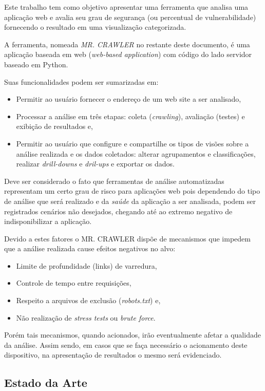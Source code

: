 \documentclass[twocolumn,showpacs,%
  nofootinbib,aps,superscriptaddress,%
  eqsecnum,prd,notitlepage,showkeys,10pt]{revtex4-1}
\begin{document}
Este trabalho tem como objetivo apresentar uma ferramenta que analisa uma aplicação web e avalia seu grau de segurança (ou percentual de vulnerabilidade) fornecendo o resultado em uma visualização categorizada.

A ferramenta, nomeada \emph{MR. CRAWLER} no restante deste documento, é uma aplicação baseada em web (\emph{web-based application}) com código do lado servidor baseado em Python.

Suas funcionalidades podem ser sumarizadas em:

\begin{itemize}
\item Permitir ao usuário fornecer o endereço de um web site a ser analisado,
\item Processar a análise em três etapas: coleta (\emph{crawling}), avaliação (testes) e exibição de resultados e,
\item Permitir ao usuário que configure e compartilhe os tipos de visões sobre a análise realizada e os dados coletados: alterar agrupamentos e classificações, realizar \emph{drill-downs} e \emph{dril-ups} e exportar os dados.
\end{itemize}

Deve ser considerado o fato que ferramentas de análise automatizadas representam um certo grau de risco para aplicações web pois dependendo do tipo de análise que será realizado e da \emph{saúde} da aplicação a ser analisada, podem ser registrados cenários não desejados, chegando até ao extremo negativo de indisponibilizar a aplicação.

Devido a estes fatores o MR. CRAWLER dispõe de mecanismos que impedem que a análise realizada cause efeitos negativos no alvo:

\begin{itemize}
\item Limite de profundidade (links) de varredura,
\item Controle de tempo entre requisições,
\item Respeito a arquivos de exclusão (\emph{robots.txt}) e,
\item Não realização de \emph{stress tests} ou \emph{brute force}.
\end{itemize}

Porém tais mecanismos, quando acionados, irão eventualmente afetar a qualidade da análise. Assim sendo, em casos que se faça necessário o acionamento deste dispositivo, na apresentação de resultados o mesmo será evidenciado.

\subsection{Estado da Arte}
\end{document}
